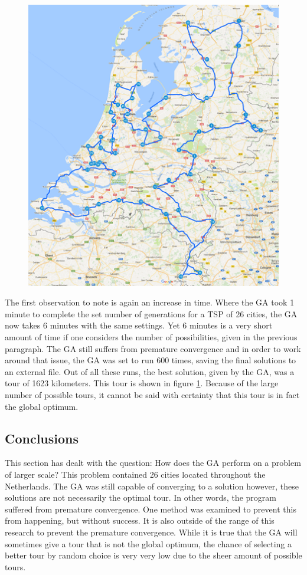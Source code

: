 \begin{figure}[t!]
\centering
\includegraphics{1623tour}
\label{1623tour}
\end{figure}

\par
The first observation to note is again an increase in time. Where the GA took 1 minute to complete the set number of generations for a TSP of 26 cities, the GA now takes 6 minutes with the same settings. Yet 6 minutes is a very short amount of time if one considers the number of possibilities, given in the previous paragraph. The GA still suffers from premature convergence and in order to work around that issue, the GA was set to run 600 times, saving the final solutions to an external file. Out of all these runs, the best solution, given by the GA, was a tour of 1623 kilometers. This tour is shown in figure \ref{1623tour}. Because of the large number of possible tours, it cannot be said with certainty that this tour is in fact the global optimum. 


\subsection{Conclusions}
\par
This section has dealt with the question: How does the GA perform on a problem of larger scale? This problem contained 26 cities located throughout the Netherlands. The GA was still capable of converging to a solution however, these solutions are not necessarily the optimal tour. In other words, the program suffered from premature convergence. One method was examined to prevent this from happening, but without success. It is also outside of the range of this research to prevent the premature convergence. While it is true that the GA will sometimes give a tour that is not the global optimum, the chance of selecting a better tour by random choice is very very low due to the sheer amount of possible tours. 


